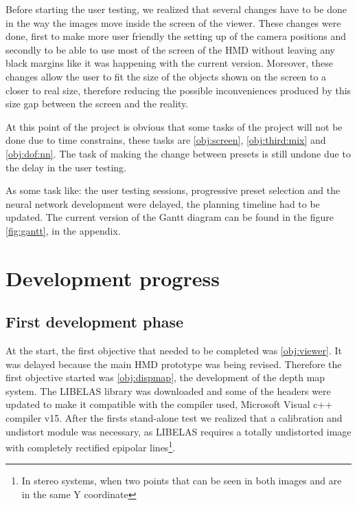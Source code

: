 \documentclass[10pt,a4paper,twocolumn,twoside]{article}
\begin{document}
	Before starting the user testing, we realized that several changes have to be done in the way the images move inside the screen of the viewer. These changes were done, first to make more user friendly the setting up of the camera positions and secondly to be able to use most of the screen of the HMD without leaving any black margins like it was happening with the current version. Moreover, these changes allow the user to fit the size of the objects shown on the screen to a closer to real size, therefore reducing the possible inconveniences produced by this size gap between the screen and the reality.
	
	At this point of the project is obvious that some tasks of the project will not be done due to time constrains, these tasks are \ref{obj:screen}, \ref{obj:third:mix} and \ref{obj:dof:nn}. The task of making the change between presets is still undone due to the delay in the user testing. 

	As some task like: the user testing sessions, progressive preset selection and the neural network development were delayed, the planning timeline had to be updated. The current version of the Gantt diagram can be found in the figure \ref{fig:gantt}, in the appendix.
	
	
	\section{Development progress}
	 
	\subsection{First development phase}
	
	At the start, the first objective that needed to be completed was \ref{obj:viewer}. It was delayed because the main HMD prototype was being revised. Therefore the first objective started was \ref{obj:dispmap}, the development of the depth map system. The LIBELAS library was downloaded and some of the headers were updated to make it compatible with the compiler used, Microsoft Visual c++ compiler v15. After the firsts stand-alone test we realized that a calibration and undistort module was necessary, as LIBELAS requires a totally undistorted image with completely rectified epipolar lines\footnote{In stereo systems, when two points that can be seen in both images and are in the same Y coordinate}. 
	
\end{document}
